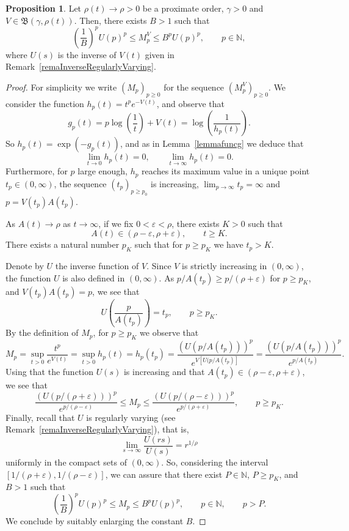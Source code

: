 \documentclass[11pt,a4paper]{article}
\theoremstyle{definition}
\newtheorem{pro}[theo]{Proposition}
\newenvironment{prop}{\smallskip\begin{pro}}{\end{pro}\smallskip}
\def\oo{\infty}
\def\ri{\rightarrow}
\def\ep{\varepsilon}
\def\ga{\gamma}
\def\ro{\rho}
\def\Bet{\mathfrak{B}}
\def\N{\mathbb{N}}
\begin{document}
  \begin{prop}\label{theorelMandU}
  Let $\ro(t) \ri \ro>0$ be a proximate order,  $\ga>0$ and $V \in \Bet(\ga, \ro(t) )$. Then, there exists $B>1$ such that
   \begin{equation}\label{equation.weak.UyM}
   \left(\frac{1}{B}\right)^p U(p)^p\leq M^V_p\leq B^p U(p)^p, \qquad p \in \N,
   \end{equation}
  where $U(s)$ is the inverse of $V(t)$ given in Remark~\ref{remaInverseRegularlyVarying}.
 \end{prop}
 \begin{proof}
 For simplicity we write $(M_p)_{p\geq0}$ for the sequence $(M^V_p)_{p\geq0}$.
 We consider the function $h_p(t)=t^p e^{-V(t)}$, and observe that
 $$g_{p}(t)=p\log \left(\frac{1}{t}\right)+V(t)=\log \left(\frac{1}{h_p(t)}\right).$$
 So $h_p(t)=\exp(-g_{p}(t))$, and as in Lemma~\ref{lemmafuncg} we deduce that
 $$\lim_{t\ri0}h_p(t) = 0, \qquad\lim_{t\ri\oo}h_p(t) = 0.$$
  Furthermore, for $p$ large enough, $h_{p}$ reaches its maximum value in a unique point $t_p\in(0,\oo)$, the sequence $(t_p)_{p\geq p_0}$ is increasing,
    $\lim_{p\ri\oo} t_p=\oo$ and $p=V(t_p)A(t_p)$.

  As $A(t)\ri\ro$ as $t\ri\oo$,
  if we fix $0<\ep<\ro$, there exists $K>0$ such that
  $$A(t)\in(\ro-\ep,\ro+\ep),\qquad t\geq K.$$
There exists a natural number $p_{K}$ such that for $p\geq p_{K}$ we have $t_p>K$.


Denote by $U$ the inverse function of $V$. Since $V$ is strictly increasing in $(0,\infty)$, the function $U$ is also defined in $(0,\infty)$.
As $p/A(t_p)\geq p/(\ro+\ep)$ for $p\geq p_K$, and
$V(t_p)A(t_p)=p$, we see that
$$U\left(\frac{p}{A(t_p)}\right)=t_p, \qquad p\geq p_K.$$
By the definition of $M_p$, for $p\geq p_K$ we observe that
$$M_p=\sup_{t>0} \frac{t^p}{e^{V(t)}}=\sup_{t>0} h_p(t)=h_p(t_p)= \frac{\left(U(p/A(t_p))\right)^p}{e^{V[U(p/A(t_p)]}}= \frac{\left(U(p/A(t_p))\right)^p}{e^{p/A(t_p)}}.$$
Using that the function $U(s)$ is increasing and that $A(t_p)\in(\ro-\ep,\ro+\ep) $,
we see that
$$\frac{\left(U(p/(\ro+\ep))\right)^p}{e^{p/(\ro-\ep)}}\leq M_p\leq \frac{\left(U(p/(\ro-\ep))\right)^p}{e^{p/(\ro+\ep)}},
\qquad p\geq p_K.$$
Finally, recall that $U$ is regularly varying (see Remark~\ref{remaInverseRegularlyVarying}), that is,
$$\lim_{s\ri\oo}\frac{U(rs)}{U(s)}=r^{1/\ro}$$
uniformly in the compact sets of $(0,\oo)$. So, considering the interval $[1/(\ro+\ep),1/(\ro-\ep)]$, we can assure that there exist
$P\in\N$, $P\geq p_K$, and $B>1$ such that
 $$\left(\frac{1}{B}\right)^p U(p)^p\leq M_p\leq B^p U(p)^p, \qquad p \in \N, \qquad p>P.$$
We conclude by suitably enlarging the constant $B$.
\end{proof}
\end{document}
